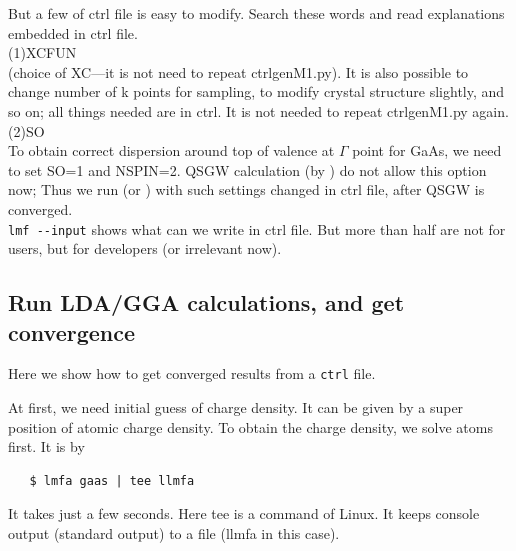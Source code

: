 But a few of ctrl file is easy to modify. Search these words and read 
explanations embedded in ctrl file.\\
(1)XCFUN \\
(choice of XC---it is not need to repeat ctrlgenM1.py). 
It is also possible to change number of k points for sampling, to modify
crystal structure slightly, and so on; all things needed are in ctrl.
It is not needed to repeat ctrlgenM1.py again.\\
(2)SO \\
To obtain correct dispersion around top of valence at 
$\Gamma$ point for GaAs, we need to set SO=1 and NSPIN=2. 
QSGW calculation (by ) do not allow this option now;
Thus we run  (or )
with such settings changed in ctrl file, after QSGW is converged.\\

\verb+lmf --input+ shows what can we write in ctrl file.
But more than half are not for users, but for developers 
(or irrelevant now).
 

\subsection{Run LDA/GGA calculations, and get convergence}
\label{lm7K-scf}
Here we show how to get converged results from a \verb+ctrl+ file.

At first, we need initial guess of charge density.
It can be given by a super position of atomic charge density.
To obtain the charge density, we solve atoms first. It is by
\begin{verbatim}
   $ lmfa gaas | tee llmfa
\end{verbatim}
It takes just a few seconds. Here tee is a command of Linux.
It keeps console output (standard output) to a file (llmfa in this case).

